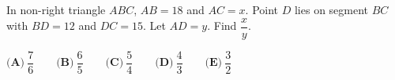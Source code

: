 In non-right triangle $ABC$, $AB=18$ and $AC=x$. Point $D$ lies on segment $BC$ with $BD=12$ and $DC=15$. Let $AD=y$. Find $\dfrac{x}{y}$.

$\textbf{(A)}\ \dfrac{7}{6}\qquad\textbf{(B)}\ \dfrac{6}{5}\qquad\textbf{(C)}\ \dfrac{5}{4}\qquad\textbf{(D)}\ \dfrac{4}{3}\qquad\textbf{(E)}\ \dfrac{3}{2}$

